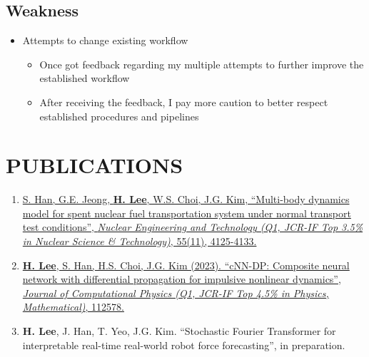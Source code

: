 \documentclass[a4paper,10pt]{extarticle}
\begin{document}
\subsection*{Weakness}
\begin{itemize}
	\item Attempts to change existing workflow
	      \begin{itemize}
		      \item Once got feedback regarding my multiple attempts to further improve the established workflow
		      \item After receiving the feedback, I pay more caution to better respect established procedures and pipelines
	      \end{itemize}
\end{itemize}

\section*{PUBLICATIONS}
\noindent
\begin{enumerate}[leftmargin=.5cm]
	\item \href{https://www.google.com/url?sa=t&rct=j&q=&esrc=s&source=web&cd=&cad=rja&uact=8&ved=2ahUKEwij36zWpNKCAxXMMEQIHSBfBMUQFnoECBEQAQ&url=https%3A%2F%2Fwww.sciencedirect.com%2Fscience%2Farticle%2Fpii%2FS1738573323003492&usg=AOvVaw1zj_G3k5c77uhMNnmu0EEC&opi=89978449}{S. Han, G.E. Jeong, \textbf{H. Lee}, W.S. Choi, J.G. Kim, “Multi-body dynamics model for spent nuclear fuel transportation system under normal transport test conditions”, \textit{Nuclear Engineering and Technology (Q1, JCR-IF Top 3.5\% in Nuclear Science \& Technology)}, 55(11), 4125-4133.}
	\item \href{https://www.sciencedirect.com/science/article/pii/S0021999123006733?casa_token=ARUkhI8XI8YAAAAA:wTzCIauJvSlonWw-J-SlAFqPX6NZRQS-qBX59l4YN5O3caEppoglU0duVmMkZYf4nWYd7tm_D_E}{\textbf{H. Lee}, S. Han, H.S. Choi, J.G. Kim (2023). “cNN-DP: Composite neural network with differential propagation for impulsive nonlinear dynamics”, \textit{Journal of Computational Physics (Q1, JCR-IF Top 4.5\% in Physics, Mathematical)}, 112578.}
	\item \textbf{H. Lee}, J. Han, T. Yeo, J.G. Kim. “Stochastic Fourier Transformer for interpretable real-time real-world robot force forecasting”, in preparation.
\end{enumerate}

\end{document}
